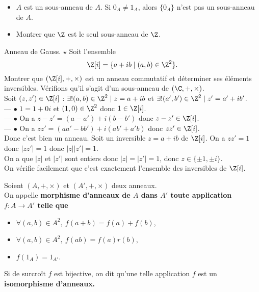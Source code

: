 \documentclass[11pt]{article}
\begin{document}
\begin{ex}{}{}
    \begin{itemize}
        \item $A$ est un sous-anneau de $A$. Si $0_A\neq1_A$, alors $\{0_A\}$ n'est pas un sous-anneau de $A$.
        \item Montrer que $\Z$ est le seul sous-anneau de $\Z$.
    \end{itemize}
\end{ex}

\begin{ex}{Anneau de Gauss. $\star$}{}
    Soit l'ensemble
    \begin{equation*}
        \Z[i]=\{a+ib \mid (a,b) \in \Z^2\}.
    \end{equation*}
    Montrer que $(\Z[i], +, \times)$ est un anneau commutatif et déterminer ses éléments inversibles.
    \tcblower
    Vérifions qu'il s'agit d'un sous-anneau de $(\C,+,\times)$.\\
    Soit $(z,z')\in\Z[i]$ : $\exists! (a,b)\in\Z^2\mid z=a+ib$ et $\exists!(a',b')\in\Z^2\mid z'=a'+ib'$.\\
    --- $\bullet$ $1=1+0i$ et $(1,0)\in\Z^2$ donc $1\in\Z[i]$.\\
    --- $\bullet$ On a $z-z'=(a-a')+i(b-b')$ donc $z-z'\in\Z[i]$.\\
    --- $\bullet$ On a $zz'=(aa'-bb')+i(ab'+a'b)$ donc $zz'\in\Z[i]$.\\
    Donc c'est bien un anneau.\n
    Soit un inversible $z=a+ib$ de $\Z[i]$. On a $zz'=1$ donc $|zz'|=1$ donc $|z||z'|=1$.\\
    On a que $|z|$ et $|z'|$ sont entiers donc $|z|=|z'|=1$, donc $z\in\{\pm1,\pm i\}$.\\
    On vérifie facilement que c'est exactement l'ensemble des inversibles de $\Z[i]$.
\end{ex}

\pagebreak

\begin{defi}{}{}
    Soient $(A,+,\times)$ et $(A',+,\times)$ deux anneaux.\\
    On appelle \bf{morphisme d'anneaux} de $A$ dans $A'$ toute application $f:A\to A'$ telle que
    \begin{itemize}
        \item $\forall (a,b)\in A^2, ~ f(a+b)=f(a)+f(b)$,
        \item $\forall (a,b)\in A^2, ~ f(ab)=f(a)r(b)$,
        \item $f(1_A)=1_{A'}$.
    \end{itemize}
    Si de surcroît $f$ est bijective, on dit qu'une telle application $f$ est un \bf{isomorphisme} d'anneaux.
\end{defi}
\end{document}
